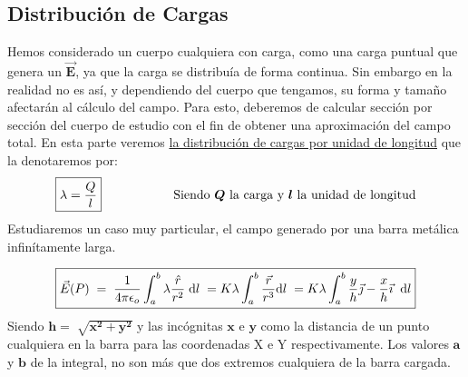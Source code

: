 \subsection{Distribución de Cargas}
\noindent Hemos considerado un cuerpo cualquiera con carga, como una carga puntual que genera un \(\bm{\vec{E}}\), ya que la carga se distribuía de forma continua. Sin embargo en la realidad no es así, y dependiendo del cuerpo que tengamos, su forma y tamaño afectarán al cálculo del campo. Para esto, deberemos de calcular sección por sección del cuerpo de estudio con el fin de obtener una aproximación del campo total. En esta parte veremos \underline{la distribución de cargas por unidad de longitud} que la denotaremos por:
\[ \boxed{\lambda = \frac{Q}{l}} \hspace{2cm} \textnormal{Siendo \(\bm{Q}\) la carga y \(\bm{l}\) la unidad de longitud}\]
Estudiaremos un caso muy particular, el campo generado por una barra metálica \\ infinítamente larga.\par
\vspace{0.5cm}
\hspace{4.5cm}
\vspace{0.5cm}
\[
        \boxed{\vec{E}(P) \hspace{1mm} = \hspace{1mm}\frac{1}{4\pi\epsilon_o}\int^{b}_{a} \lambda \frac{\hat{r}}{r^2}\hspace{1mm} \mathrm{d}l \hspace{1mm} = K\lambda \int^{b}_{a}\frac{\vec{r}}{r^3} \mathrm{d}l\hspace{1mm} = K\lambda \int_{a}^{b} \frac{y}{h}\vec{\jmath} -\frac{x}{h} \vec{\imath} \hspace{2mm}\mathrm{d}l}
\]
Siendo \(\bm{h = \sqrt[]{x^2+y^2}}\) y las incógnitas \(\bm{x}\) e \(\bm{y}\) como la distancia de un punto cualquiera en la barra para las coordenadas X e Y respectivamente. Los valores \(\bm{a}\) y \(\bm{b}\) de la integral, no son más que dos extremos cualquiera de la barra cargada.

